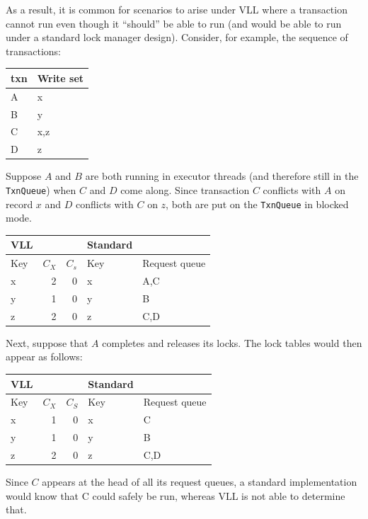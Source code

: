 \documentclass[11pt]{article}
\begin{document}
As a result, it is common for scenarios to arise under VLL where a transaction cannot run even though
it “should” be able to run (and would be able to run under a standard lock manager design). Consider,
for example, the sequence of transactions:
\begin{center}
\begin{tabular}{ll}
\hline
txn & Write set\\
\hline
A & x\\
B & y\\
C & x,z\\
D & z\\
\hline
\end{tabular}
\end{center}

Suppose \(A\) and \(B\) are both running in executor threads (and therefore still in the \texttt{TxnQueue})
when \(C\) and \(D\) come along. Since transaction \(C\) conflicts with \(A\) on record \(x\) and
\(D\) conflicts with \(C\) on \(z\), both are put on the \texttt{TxnQueue} in blocked mode.
\begin{center}
\begin{tabular}{lrrll}
\hline
VLL &  &  & Standard & \\
\hline
Key & \(C_X\) & \(C_s\) & Key & Request queue\\
\hline
x & 2 & 0 & x & A,C\\
y & 1 & 0 & y & B\\
z & 2 & 0 & z & C,D\\
\hline
\end{tabular}
\end{center}

Next, suppose that \(A\) completes and releases its locks. The lock tables would then appear as
follows:
\begin{center}
\begin{tabular}{lrrll}
\hline
VLL &  &  & Standard & \\
\hline
Key & \(C_X\) & \(C_S\) & Key & Request queue\\
\hline
x & 1 & 0 & x & C\\
y & 1 & 0 & y & B\\
z & 2 & 0 & z & C,D\\
\hline
\end{tabular}
\end{center}

Since \(C\) appears at the head of all its request queues, a standard implementation would know that C
could safely be run, whereas VLL is not able to determine that.
\end{document}

